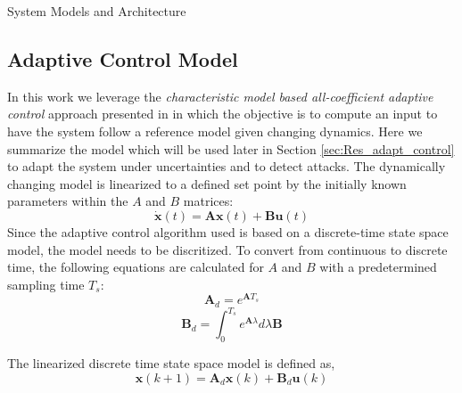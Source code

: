\begin{section}{System Models and Architecture}
\subsection{Adaptive Control Model}
In this work we leverage the \textit{characteristic model based all-coefficient adaptive control} approach presented in \cite{4106038} in which the objective is to compute an input to have the system follow a reference model given changing dynamics. Here we summarize the model which will be used later in Section  \ref{sec:Res_adapt_control} to adapt the system under uncertainties and to detect attacks. The dynamically changing model is linearized to a defined set point by the initially known parameters within the $A$ and $B$ matrices:
	\begin{equation}
	\dot{\bm{x}}(t) = \bm{A}\bm{x}(t) + \bm{B}\bm{u}(t)
	\end{equation}
Since the adaptive control algorithm used is based on a discrete-time state space model, the model needs to be discritized. To convert from continuous to discrete time, the following equations are calculated for $A$ and $B$ with a predetermined sampling time $T_s$:
    \begin{equation}
	\bm{A}_d = e^{\bm{A}T_s}
	\end{equation}
    \begin{equation}
	\bm{B}_d = \int_0^{T_s} e^{\bm{A}\lambda}d\lambda \bm{B}
	\end{equation}

The linearized discrete time state space model is defined as,
    \begin{equation}
	\bm{x}(k+1) = \bm{A}_d\bm{x}(k) + \bm{B}_d\bm{u}(k)
	\end{equation}


\end{section}
